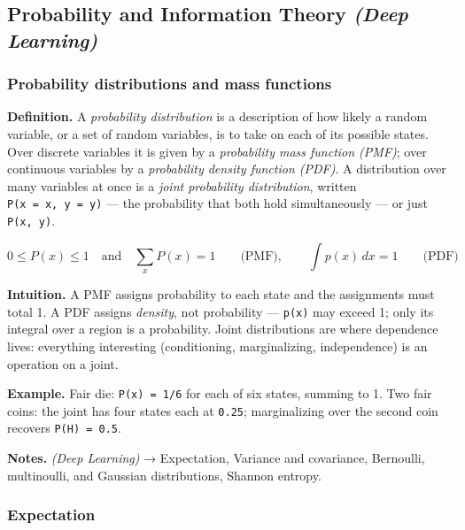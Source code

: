 \documentclass[
  10pt,
  letterpaper,
  onecolumn]{article}
\begin{document}
\hypertarget{probability-and-information-theory-deep-learning}{%
\subsection{\texorpdfstring{Probability and Information Theory
\emph{(Deep
Learning)}}{Probability and Information Theory (Deep Learning)}}\label{probability-and-information-theory-deep-learning}}

\hypertarget{probability-distributions-and-mass-functions}{%
\subsubsection{Probability distributions and mass
functions}\label{probability-distributions-and-mass-functions}}

\textbf{Definition.} A \emph{probability distribution} is a description
of how likely a random variable, or a set of random variables, is to
take on each of its possible states. Over discrete variables it is given
by a \emph{probability mass function (PMF)}; over continuous variables
by a \emph{probability density function (PDF)}. A distribution over many
variables at once is a \emph{joint probability distribution}, written
\texttt{P(x\ =\ x,\ y\ =\ y)} --- the probability that both hold
simultaneously --- or just \texttt{P(x,\ y)}.

\begin{equation*}
0\le P(x)\le 1\quad\text{and}\quad\sum_{x} P(x)=1
\qquad\text{(PMF)},
\qquad
\int p(x)\,dx=1
\qquad\text{(PDF)}
\end{equation*}

\textbf{Intuition.} A PMF assigns probability to each state and the
assignments must total 1. A PDF assigns \emph{density}, not probability
--- \texttt{p(x)} may exceed 1; only its integral over a region is a
probability. Joint distributions are where dependence lives: everything
interesting (conditioning, marginalizing, independence) is an operation
on a joint.

\textbf{Example.} Fair die: \texttt{P(x)\ =\ 1/6} for each of six states,
summing to 1. Two fair coins: the joint has four states each at
\texttt{0.25}; marginalizing over the second coin recovers
\texttt{P(H)\ =\ 0.5}.

\textbf{Notes.} \emph{(Deep Learning)} → Expectation, Variance and
covariance, Bernoulli, multinoulli, and Gaussian distributions,
Shannon entropy.

\hypertarget{expectation}{%
\subsubsection{Expectation}\label{expectation}}
\end{document}
